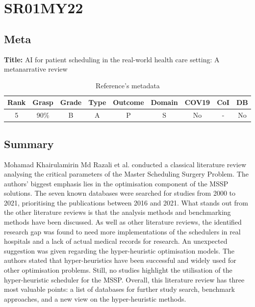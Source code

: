 \section{ SR01MY22 }


\subsection{Meta}

    \textbf{Title:}
    AI for patient scheduling in the real-world health care setting: A metanarrative review

    \begin{table}[H]
        \centering
        \begin{tabular}{|c|c|c|c|c|c|c|c|c|}
            \hline
                \textbf{Rank} & \textbf{Grasp} & \textbf{Grade} & \textbf{Type} & \textbf{Outcome} & \textbf{Domain} & \textbf{COV19} & \textbf{CoI} & \textbf{DB} \\
            \hline
                5 & 90\% & B & A & P & S & No & - & No \\
            \hline
        \end{tabular}
        \caption{Reference's metadata}
        \label{tab:SR01MY22}
    \end{table}

\subsection{Summary}
    Mohamad Khairulamirin Md Razali et al. conducted a classical literature review analysing the critical parameters of the Master Scheduling Surgery Problem. The authors' biggest emphasis lies in the optimisation component of the MSSP solutions. The seven known databases were searched for studies from 2000 to 2021, prioritising the publications between 2016 and 2021. What stands out from the other literature reviews is that the analysis methods and benchmarking methods have been discussed. As well as other literature reviews, the identified research gap was found to need more implementations of the schedulers in real hospitals and a lack of actual medical records for research. An unexpected suggestion was given regarding the hyper-heuristic optimisation models. The authors stated that hyper-heuristics have been successful and widely used for other optimisation problems. Still, no studies highlight the utilisation of the hyper-heuristic scheduler for the MSSP. Overall, this literature review has three most valuable points: a list of databases for further study search, benchmark approaches, and a new view on the hyper-heuristic methods.
    

